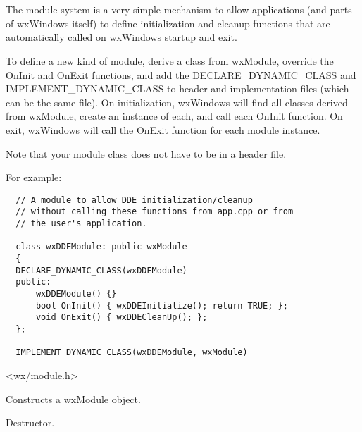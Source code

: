 \section{}\label{wxmodule}

The module system is a very simple mechanism to allow applications (and parts of wxWindows itself) to
define initialization and cleanup functions that are automatically called on wxWindows
startup and exit.

To define a new kind of module, derive a class from wxModule, override the OnInit and OnExit functions,
and add the DECLARE\_DYNAMIC\_CLASS and IMPLEMENT\_DYNAMIC\_CLASS to header and implementation files
(which can be the same file). On initialization, wxWindows will find all classes derived from wxModule,
create an instance of each, and call each OnInit function. On exit, wxWindows will call the OnExit
function for each module instance.

Note that your module class does not have to be in a header file.

For example:

\begin{verbatim}
  // A module to allow DDE initialization/cleanup
  // without calling these functions from app.cpp or from
  // the user's application.

  class wxDDEModule: public wxModule
  {
  DECLARE_DYNAMIC_CLASS(wxDDEModule)
  public:
      wxDDEModule() {}
      bool OnInit() { wxDDEInitialize(); return TRUE; };
      void OnExit() { wxDDECleanUp(); };
  };

  IMPLEMENT_DYNAMIC_CLASS(wxDDEModule, wxModule)
\end{verbatim}




<wx/module.h>


\label{wxmoduleconstr}


Constructs a wxModule object.



Destructor.

\label{wxmodulecleanupmodules}

